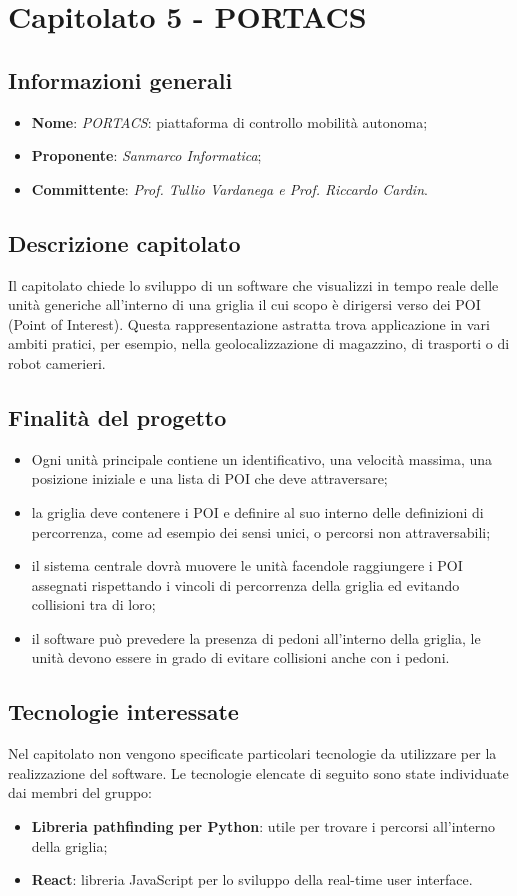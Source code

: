 \section{Capitolato 5 - PORTACS}
\subsection{Informazioni generali}
\begin{itemize}
    \item \textbf{Nome}: \emph{PORTACS}: piattaforma di controllo mobilità autonoma;
    \item \textbf{Proponente}: \emph{Sanmarco Informatica};
    \item \textbf{Committente}: \emph{Prof. Tullio Vardanega e Prof. Riccardo Cardin}.
\end{itemize}
\subsection{Descrizione capitolato}
Il capitolato chiede lo sviluppo di un software che visualizzi in tempo reale delle unità generiche all'interno di una griglia il cui scopo è dirigersi verso dei POI (Point of Interest). Questa rappresentazione astratta trova applicazione in vari ambiti pratici, per esempio, nella geolocalizzazione di magazzino, di trasporti o di robot camerieri.
\subsection{Finalità del progetto}
\begin{itemize}
    \item Ogni unità principale contiene un identificativo, una velocità massima, una posizione iniziale e una lista di POI che deve attraversare;
    \item la griglia deve contenere i POI e definire al suo interno delle definizioni di percorrenza, come ad esempio dei sensi unici, o percorsi non attraversabili;
    \item il sistema centrale dovrà muovere le unità facendole raggiungere i POI assegnati rispettando i vincoli di percorrenza della griglia ed evitando collisioni tra di loro;
    \item il software può prevedere la presenza di pedoni all'interno della griglia, le unità devono essere in grado di evitare collisioni anche con i pedoni.
\end{itemize}
\subsection{Tecnologie interessate}
Nel capitolato non vengono specificate particolari tecnologie da utilizzare per la realizzazione del software. Le tecnologie elencate di seguito sono state individuate dai membri del gruppo:
\begin{itemize}
    \item \textbf{Libreria pathfinding per Python}: utile per trovare i percorsi all’interno della griglia;
    \item \textbf{React}: libreria JavaScript per lo sviluppo della real-time user interface.
\end{itemize}
